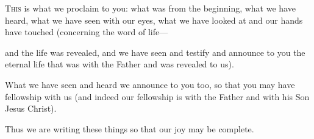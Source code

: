 \gdef\bbookchaptable{\vspace{4pt}%
\parbox[t]{\linewidth}{\centering\small\hyperlink{ch-1john-1}{\textit{\small 1}}\hspace{0.4em}\hyperlink{ch-1john-2}{\textit{\small 2}}\hspace{0.4em}\hyperlink{ch-1john-3}{\textit{\small 3}}\hspace{0.4em}\hyperlink{ch-1john-4}{\textit{\small 4}}\hspace{0.4em}\hyperlink{ch-1john-5}{\textit{\small 5}}}%
\vspace{6pt}}

\begin{scripture}

 \allowchapbreak\hypertarget{ch-1john-1}{}\lettrine[lines=8]{\color{general}T}{\textsc{his}} is what we proclaim to you: what was from the beginning, what we have heard, what we have seen with our eyes, what we have looked at and our hands have touched (concerning the word of life---\everypar{}
 and the life was revealed, and we have seen and testify and announce to you the eternal life that was with the Father and was revealed to us).
 What we have seen and heard we announce to you too, so that you may have fellowship with us (and indeed our fellowship is with the Father and with his Son Jesus Christ).
 Thus we are writing these things so that our joy may be complete.
\everypar{}


\end{scripture}
